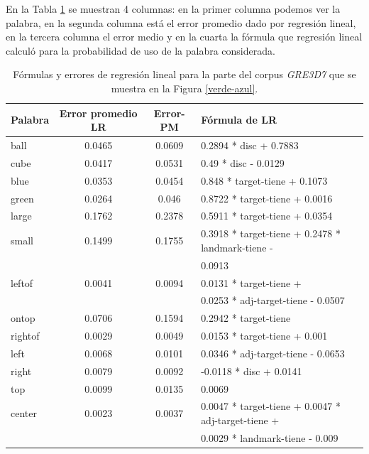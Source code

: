 En la Tabla \ref{tabla-linear-regresion-all} se muestran 4 columnas: en la primer columna podemos ver la palabra, 
en la segunda columna est\'a el error promedio dado por regresi\'on lineal, en la tercera columna el error medio 
y en la cuarta la f\'ormula que regresi\'on lineal calcul\'o para la probabilidad de uso de la palabra considerada.

\begin{table}[H]
\begin{center}
\begin{tabular}{|l|c|c|l|}
\hline
Palabra &Error promedio	LR	& Error-PM	& F\'ormula de LR\\
\hline
ball		 &0.0465   &0.0609	  & 0.2894 * disc + 0.7883\\
\hline
cube		 &0.0417	 &0.0531	  &0.49   * disc - 0.0129\\
\hline
\hline
blue		 &0.0353	 &0.0454	  &0.848  * target-tiene + 0.1073\\
\hline
green		 &0.0264	 &0.046	    &0.8722 * target-tiene + 0.0016\\
\hline
\hline
large		 &0.1762	 &0.2378	  &0.5911 * target-tiene + 0.0354\\
\hline
small		 &0.1499	 &0.1755	  &0.3918 * target-tiene + 0.2478 * landmark-tiene -\\
				 &				 &					&0.0913\\
\hline
\hline
leftof  &0.0041	 &0.0094	  &0.0131 * target-tiene +\\
				 &				 &					&0.0253 * adj-target-tiene - 0.0507\\
\hline
ontop	 &0.0706	 &0.1594	  &0.2942 * target-tiene \\
\hline
rightof &0.0029	 &0.0049	  &0.0153 * target-tiene + 0.001\\
\hline
\hline
left		 &0.0068	 &0.0101	  &0.0346 * adj-target-tiene - 0.0653\\
\hline
right		 &0.0079	 &0.0092	  &-0.0118 * disc + 0.0141\\
\hline
top    &0.0099 	 &0.0135		& 0.0069\\
\hline
center	 &0.0023	 &0.0037	  &0.0047 * target-tiene + 0.0047 * adj-target-tiene +\\
				 &				 &					&0.0029 * landmark-tiene - 0.009\\
\hline
\end{tabular}
\caption{F\'ormulas y errores de regresi\'on lineal para la parte del corpus \textit{GRE3D7} que se muestra en la Figura \ref{verde-azul}.}
\label{tabla-linear-regresion-all}
\end{center}
\end{table}

